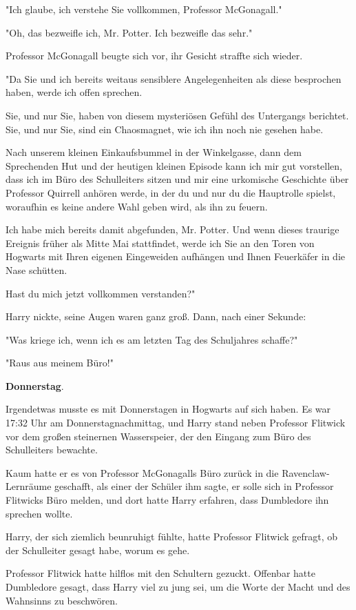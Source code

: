 {"Ich glaube, ich verstehe Sie vollkommen, Professor McGonagall."

"Oh, das bezweifle ich, Mr. Potter. Ich bezweifle das sehr."

Professor McGonagall beugte sich vor, ihr Gesicht straffte sich wieder.

"Da Sie und ich bereits weitaus sensiblere Angelegenheiten als diese besprochen haben, werde ich offen sprechen.

Sie, und nur Sie, haben von diesem mysteriösen Gefühl des Untergangs berichtet. Sie, und nur Sie, sind ein Chaosmagnet, wie ich ihn noch nie gesehen habe.

Nach unserem kleinen Einkaufsbummel in der Winkelgasse, dann dem Sprechenden Hut und der heutigen kleinen Episode kann ich mir gut vorstellen, dass ich im Büro des Schulleiters sitzen und mir eine urkomische Geschichte über Professor Quirrell anhören werde, in der du und nur du die Hauptrolle spielst, woraufhin es keine andere Wahl geben wird, als ihn zu feuern.

Ich habe mich bereits damit abgefunden, Mr. Potter. Und wenn dieses traurige Ereignis früher als Mitte Mai stattfindet, werde ich Sie an den Toren von Hogwarts mit Ihren eigenen Eingeweiden aufhängen und Ihnen Feuerkäfer in die Nase schütten.

Hast du mich jetzt vollkommen verstanden?"

Harry nickte, seine Augen waren ganz groß. Dann, nach einer Sekunde:

"Was kriege ich, wenn ich es am letzten Tag des Schuljahres schaffe?"

"Raus aus meinem Büro!"

\textbf{Donnerstag}.

Irgendetwas musste es mit Donnerstagen in Hogwarts auf sich haben. Es war 17:32 Uhr am Donnerstagnachmittag, und Harry stand neben Professor Flitwick vor dem großen steinernen Wasserspeier, der den Eingang zum Büro des Schulleiters bewachte.

Kaum hatte er es von Professor McGonagalls Büro zurück in die Ravenclaw-Lernräume geschafft, als einer der Schüler ihm sagte, er solle sich in Professor Flitwicks Büro melden, und dort hatte Harry erfahren, dass Dumbledore ihn sprechen wollte.

Harry, der sich ziemlich beunruhigt fühlte, hatte Professor Flitwick gefragt, ob der Schulleiter gesagt habe, worum es gehe.

Professor Flitwick hatte hilflos mit den Schultern gezuckt. Offenbar hatte Dumbledore gesagt, dass Harry viel zu jung sei, um die Worte der Macht und des Wahnsinns zu beschwören.

}
